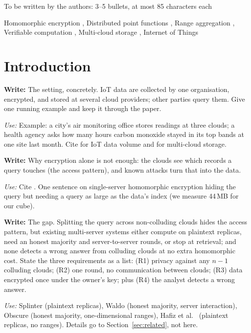 \documentclass[a4paper,fleqn]{cas-sc}
\newif\ifskeleton \skeletontrue          %
\newcommand{\para}[2]{\ifskeleton\begin{parabox}\textbf{Write:} #1
  \par\smallskip\textit{Use:} #2\end{parabox}\fi}
\begin{document}
\begin{highlights}
\item To be written by the authors: 3--5 bullets, at most 85 characters each
\end{highlights}

\begin{keywords}
Homomorphic encryption \sep
Distributed point functions \sep
Range aggregation \sep
Verifiable computation \sep
Multi-cloud storage \sep
Internet of Things
\end{keywords}

\maketitle

\section{Introduction}
\label{sec:intro}

\para{The setting, concretely. IoT data are collected by one organisation,
encrypted, and stored at several cloud providers; other parties query them.
Give one running example and keep it through the paper.}{Example: a city's air
monitoring office stores readings at three clouds; a health agency asks how many
hours carbon monoxide stayed in its top bands at one site last month. Cite
\citep{atzori2010internet} for IoT data volume and
\citep{petcu2013multicloud,grozev2014intercloud} for multi-cloud storage.}

\para{Why encryption alone is not enough: the clouds see which records a query
touches (the access pattern), and known attacks turn that into the data.}{Cite
\citep{islam2012access,cash2015leakage,grubbs2017leakage}. One sentence on
single-server homomorphic encryption hiding the query but needing a query as
large as the data's index (we measure 44\,MB for our cube).}

\para{The gap. Splitting the query across non-colluding clouds hides the access
pattern, but existing multi-server systems either compute on plaintext replicas,
need an honest majority and server-to-server rounds, or stop at retrieval; and
none detects a wrong answer from colluding clouds at no extra homomorphic cost.
State the three requirements as a list: (R1) privacy against any $n-1$ colluding
clouds; (R2) one round, no communication between clouds; (R3) data encrypted
once under the owner's key; plus (R4) the analyst detects a wrong
answer.}{Splinter \citep{splinter} (plaintext replicas), Waldo \citep{waldo}
(honest majority, server interaction), Obscure \citep{gupta2020obscure} (honest
majority, one-dimensional ranges), Hafiz et al.\ \citep{hafiz2024private}
(plaintext replicas, no ranges). Details go to Section~\ref{sec:related}, not
here.}
\end{document}
